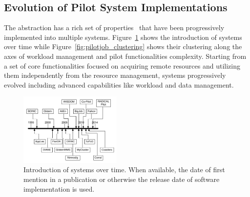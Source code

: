 \documentclass{sig-alternate}
\begin{document}
\subsection{Evolution of Pilot System Implementations}
\label{sec:histimpl}

The \pilot abstraction has a rich set of properties~\cite{pstar-2012} that have
been progressively implemented into multiple \pilot systems.
Figure~\ref{fig:timeline} shows the introduction of \pilot systems over time
while Figure~\ref{fig:pilotjob_clustering} shows their clustering along the axes
of workload management and pilot functionalities complexity. Starting from a set
of core functionalities focused on acquiring remote resources and utilizing them
independently from the resource management, \pilot systems progressively
evolved including advanced capabilities like workload and data management.



\begin{figure}[t]
  \centering
    \includegraphics[width=0.45\textwidth]{figures/timeline}
    \caption{Introduction of systems over time. When available, the date of
    first mention in a publication or otherwise the release date of software
    implementation is used. }
    \label{fig:timeline}
\end{figure}
\end{document}
